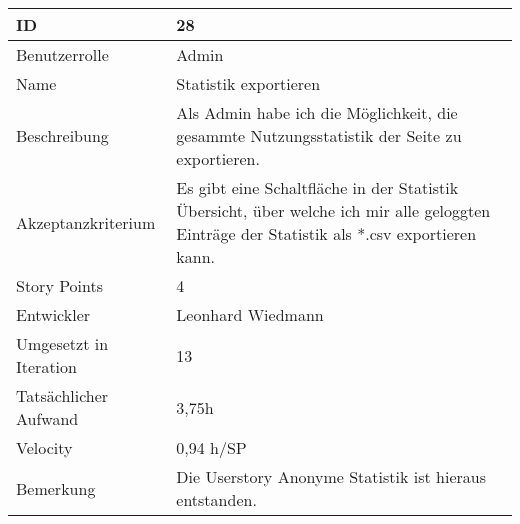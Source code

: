 \begin{tabularx}{\textwidth}{|p{}|X|}
	\hline
	ID & 28 \\
	\hline
	Benutzerrolle & Admin \\
	\hline
	Name & Statistik exportieren\\
	\hline
	Beschreibung & Als Admin habe ich die Möglichkeit, die gesammte Nutzungsstatistik der Seite zu exportieren. \\
	\hline
	Akzeptanzkriterium & Es gibt eine Schaltfläche in der Statistik Übersicht, über welche ich mir alle geloggten Einträge der Statistik als *.csv exportieren kann. \\
	\hline
	Story Points & 4 \\
	\hline
	Entwickler & Leonhard Wiedmann \\
	\hline
	Umgesetzt in Iteration & 13 \\
	\hline
	Tatsächlicher Aufwand & 3,75h \\
	\hline
	Velocity & 0,94 h/SP\\
	\hline
	Bemerkung & Die Userstory Anonyme Statistik ist hieraus entstanden.\\
	\hline
\end{tabularx}
\vspace{20pt}
